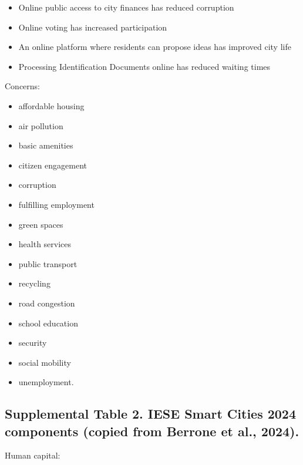 \documentclass[
  english,
  12pt,
  a4paper,
]{scrartcl}
\providecommand{\tightlist}{%
  \setlength{\itemsep}{0pt}\setlength{\parskip}{0pt}}
\begin{document}
\begin{itemize}
  \begin{itemize}
  \tightlist
  \item
    Online public access to city finances has reduced corruption
  \item
    Online voting has increased participation
  \item
    An online platform where residents can propose ideas has improved
    city life
  \item
    Processing Identification Documents online has reduced waiting times
  \end{itemize}
\end{itemize}

Concerns:

\begin{itemize}
\tightlist
\item
  affordable housing
\item
  air pollution
\item
  basic amenities
\item
  citizen engagement
\item
  corruption
\item
  fulfilling employment
\item
  green spaces
\item
  health services
\item
  public transport
\item
  recycling
\item
  road congestion
\item
  school education
\item
  security
\item
  social mobility
\item
  unemployment.
\end{itemize}

\subsection{Supplemental Table 2. IESE Smart Cities 2024 components
(copied from Berrone et al.,
2024).}\label{supplemental-table-2.-iese-smart-cities-2024-components-copied-from-berrone-et-al.-2024.}

Human capital:
\end{document}
